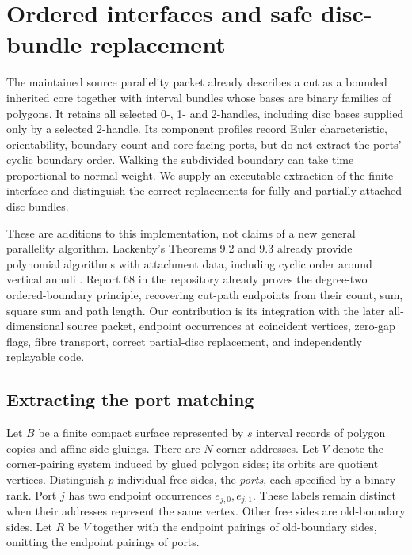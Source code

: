\section{Ordered interfaces and safe disc-bundle replacement}
\label{sec:parallelity-interface}

The maintained source parallelity packet already describes a cut as a
bounded inherited core together with interval bundles whose bases are
binary families of polygons.  It retains all selected 0-, 1- and 2-handles,
including disc bases supplied only by a selected 2-handle.  Its component
profiles record Euler characteristic, orientability, boundary count and
core-facing ports, but do not extract the ports' cyclic boundary order.
Walking the subdivided boundary can take time proportional to normal weight.
We supply an executable extraction of the finite interface and distinguish
the correct replacements for fully and partially attached disc bundles.

These are additions to this implementation, not claims of a new general
parallelity algorithm.  Lackenby's Theorems 9.2 and 9.3 already provide
polynomial algorithms with attachment data, including cyclic order around
vertical annuli \cite{Lackenby2021}.  Report 68 in the repository already
proves the degree-two ordered-boundary principle, recovering cut-path
endpoints from their count, sum, square sum and path length.  Our contribution
is its integration with the later all-dimensional source packet, endpoint
occurrences at coincident vertices, zero-gap flags, fibre transport, correct
partial-disc replacement, and independently replayable code.

\subsection{Extracting the port matching}

Let $B$ be a finite compact surface represented by $s$ interval records of
polygon copies and affine side gluings.  There are $N$ corner addresses.
Let $V$ denote the corner-pairing system induced by glued polygon sides;
its orbits are quotient vertices.  Distinguish $p$ individual free sides,
the \emph{ports}, each specified by a binary rank.  Port $j$ has two endpoint
occurrences $e_{j,0},e_{j,1}$.  These labels remain distinct when their
addresses represent the same vertex.  Other free sides are old-boundary
sides.  Let $R$ be $V$ together with the endpoint pairings of old-boundary
sides, omitting the endpoint pairings of ports.

